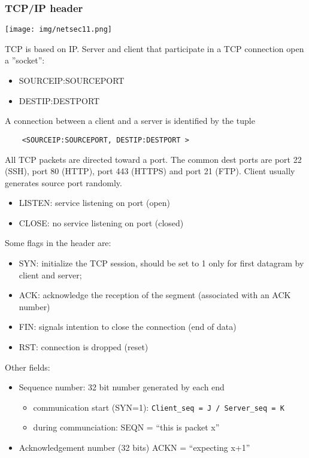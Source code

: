 \documentclass[a4paper, 10pt, titlepage]{article}
\begin{document}
\subsubsection*{TCP/IP header}
\begin{center}
	\texttt{[image: img/netsec11.png]}
\end{center}
TCP is based on IP. Server and client that participate in a TCP connection open a ”socket”:
\begin{itemize}
\item SOURCEIP:SOURCEPORT
\item DESTIP:DESTPORT
\end{itemize}
A connection between a client and a server is identified by the tuple
\begin{lstlisting}
	<SOURCEIP:SOURCEPORT, DESTIP:DESTPORT >
\end{lstlisting}
All TCP packets are directed toward a port. The common dest ports are port 22 (SSH), port 80 (HTTP), port 443 (HTTPS) and port 21 (FTP). Client usually generates source port randomly.
\begin{itemize}
\item LISTEN: service listening on port (open)
\item CLOSE: no service listening on port (closed)
\end{itemize}
Some flags in the header are:
\begin{itemize}
\item SYN: initialize the TCP session, should be set to 1 only for first
datagram by client and server;
\item ACK: acknowledge the reception of the segment (associated with an ACK number)
\item FIN: signals intention to close the connection (end of data)
\item RST: connection is dropped (reset)
\end{itemize}
Other fields:
\begin{itemize}
\item Sequence number: 32 bit number generated by each end
	\begin{itemize}
	\item communication start (SYN=1): \lstinline|Client_seq = J / Server_seq = K|
	\item during communciation: SEQN = “this is packet x”
	\end{itemize}
\item Acknowledgement number (32 bits) ACKN = “expecting x+1”
\end{itemize}
\end{document}
